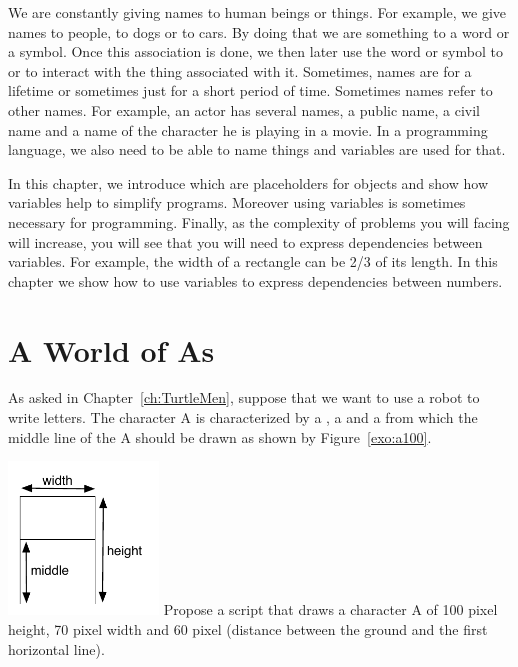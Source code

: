 We are constantly giving names to human beings or things. For example,
we give names to people, to dogs or to cars. By doing that we are
 something to a word or a symbol. Once this association is done,  we then later use the word or symbol to  or to interact
with the thing associated with it. Sometimes, names are for a lifetime
or sometimes just for a short period of time. Sometimes names
refer to other names. For example, an actor has several names, a
public name, a civil name and a name of the character he is playing in
a movie.  In a programming language, we also need to be able to name things and variables are used for that. 

In this chapter, we introduce  which are placeholders for objects and show how variables help to simplify programs. Moreover using variables is sometimes necessary for programming. Finally, as the complexity of problems you will facing will  increase, you will see that you will need to express dependencies between variables. For example, the width of a rectangle can be 2/3 of its length. In this chapter we show how to use variables to express dependencies between numbers.



\section{A World of As}
As asked in Chapter~\ref{ch:TurtleMen}, suppose that we want to use a
robot to write letters. The character A is characterized by a
, a  and a \strong{\dist} from which the middle line of the A should be drawn as shown by Figure~\ref{exo:a100}.

\begin{exofigwithsize}{\includegraphics[width=4cm]{varAnnotated}}\label{exo:a100}
Propose a script that draws a character A of 100 pixel height, 70
pixel width and 60 pixel \dist (distance between the ground and the first horizontal line).
\end{exofigwithsize}


